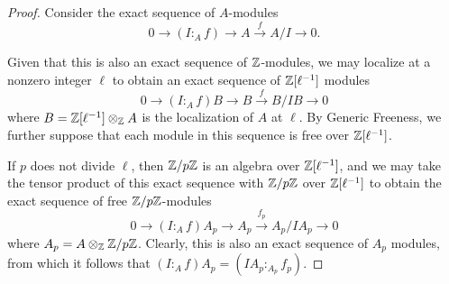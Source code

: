 \documentclass[11pt]{amsart}
\begin{document}
\begin{proof}
Consider the exact sequence of $A$-modules
\[ 0  \longrightarrow (I:_A f) \longrightarrow A \stackrel{f}{\longrightarrow} A/I \longrightarrow 0.  \]

Given that this is also an exact sequence of $\mathbb{Z}$-modules,  we may localize at a nonzero integer $\ell$ to obtain an exact sequence of $\mathbb{Z}[\ell^{-1}]$ modules
\[ 0  \longrightarrow (I:_A f)B \longrightarrow B \stackrel{f}{\longrightarrow} B/IB \longrightarrow 0  \] where $B = \mathbb{Z}[\ell^{-1}] \otimes_{\mathbb{Z}} A$ is the localization of $A$ at $\ell$.  By Generic Freeness, we further suppose that each module in this sequence is free over  $\mathbb{Z}[\ell^{-1}]$.

If $p$ does not divide $\ell$, then $\mathbb{Z}/p\mathbb{Z}$ is an algebra over $\mathbb{Z}[\ell^{-1}]$, and we may take the tensor product of this exact sequence with $\mathbb{Z}/p\mathbb{Z}$ over $\mathbb{Z}[\ell^{-1}]$ to obtain the exact sequence of free $\mathbb{Z}/p\mathbb{Z}$-modules
\[ 0  \longrightarrow (I:_A f)A_p \longrightarrow A_p \stackrel{f_p}{\longrightarrow} A_p/IA_p \longrightarrow 0  \] where $A_p = A \otimes_{\mathbb{Z}} \mathbb{Z}/p\mathbb{Z}$.  Clearly, this is also an exact sequence of $A_p$ modules, from which it follows that $ (I:_A f) A_p = (IA_p :_{A_p} f_p)$.
\end{proof}










\newpage
\end{document}
